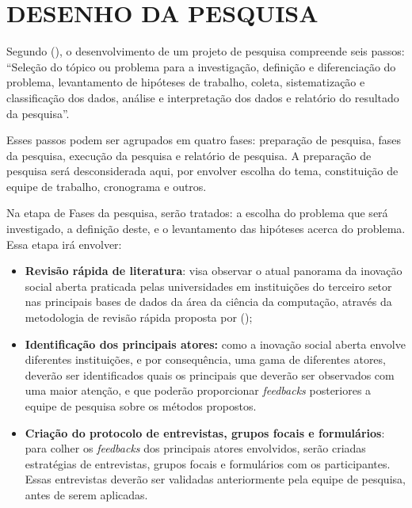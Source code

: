 \section{DESENHO DA PESQUISA}
\label{desenhodepesquisa}

Segundo \citeauthor{marconi2003} (\citeyear{marconi2003}), o desenvolvimento de um projeto de pesquisa compreende seis passos: 
“Seleção do tópico ou problema para a investigação, definição e diferenciação do problema, levantamento de hipóteses de trabalho, coleta, sistematização e classificação dos dados, análise e interpretação dos dados e relatório do resultado da pesquisa”.

Esses passos podem ser agrupados em quatro fases: preparação de pesquisa, fases da pesquisa, execução da pesquisa e relatório de pesquisa. A preparação de pesquisa será desconsiderada aqui, por envolver escolha do tema, constituição de equipe de trabalho, cronograma e outros. \cite{marconi2003}


Na etapa de Fases da pesquisa, serão tratados: a escolha do problema que será investigado, a definição deste, e o levantamento das hipóteses acerca do problema. Essa etapa irá envolver:
\begin{itemize}
    \item \textbf{Revisão rápida de literatura}: visa observar o atual panorama da inovação social aberta praticada pelas universidades em instituições do terceiro setor nas principais bases de dados da área da ciência da computação, através da metodologia de revisão rápida proposta por \citeauthor{cartaxo2020} (\citeyear{cartaxo2020});
    \item \textbf{Identificação dos principais atores:} como a inovação social aberta envolve diferentes instituições, e por consequência, uma gama de diferentes atores, deverão ser identificados quais os principais que deverão ser observados com uma maior atenção, e que poderão proporcionar \textit{feedbacks} posteriores a equipe de pesquisa sobre os métodos propostos.
    \item \textbf{Criação do protocolo de entrevistas, grupos focais e formulários}: para colher os \textit{feedbacks} dos principais atores envolvidos, serão criadas estratégias de entrevistas, grupos focais e formulários com os participantes. Essas entrevistas deverão ser validadas anteriormente pela equipe de pesquisa, antes de serem aplicadas.
\end{itemize}

